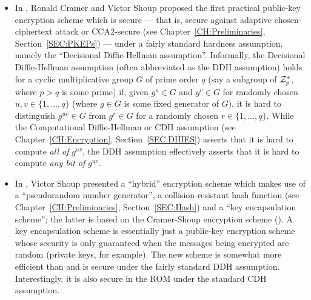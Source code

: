 \begin{itemize}
\item In \cite{cramer:cca2secure}, Ronald Cramer and Victor Shoup proposed the
first practical public-key encryption scheme which is secure --- that is,
secure against adaptive chosen-ciphertext attack or CCA2-secure (see
Chapter~\ref{CH:Preliminaries}, Section~\ref{SEC:PKEPs}) --- under a fairly
standard hardness assumption, namely the ``Decisional Diffie-Hellman
assumption''. Informally, the Decisional Diffie-Hellman assumption (often
abbreviated as the DDH assumption) holds for a cyclic multiplicative group $G$
of prime order $q$ (say a subgroup of $\mathcal{Z}_p^*$, where $p > q$ is some
prime) if, given $g^u \in G$ and $g^v \in G$ for randomly chosen $u,v \in
\{1,\ldots,q\}$ (where $g \in G$ is some fixed generator of $G$), it is hard
to distinguish $g^{uv} \in G$ from $g^r \in G$ for a randomly chosen $r \in
\{1,\ldots,q\}$. While the Computational Diffie-Hellman or CDH assumption (see
Chapter~\ref{CH:Encryption}, Section~\ref{SEC:DHIES}) asserts that it is hard
to compute {\it all of} $g^{uv}$, the DDH assumption effectively asserts that
it is hard to compute {\it any bit of} $g^{uv}$.

\item In \cite{shoup:hedge}, Victor Shoup presented a ``hybrid'' encryption
scheme which makes use of a ``pseudorandom number generator'', a
collision-resistant hash function (see Chapter~\ref{CH:Preliminaries},
Section~\ref{SEC:Hash})
and a ``key encapsulation scheme''; the latter is based on the Cramer-Shoup
encryption scheme (\cite{cramer:cca2secure}). A key encapsulation scheme is
essentially just a public-key encryption scheme whose security is only
guaranteed when the messages being encrypted are random (private keys, for
example).  The new scheme is somewhat more efficient than
\cite{cramer:cca2secure} and is secure under the fairly standard DDH
assumption.  Interestingly, it is also secure in the ROM under the standard
CDH assumption. 




\end{itemize}
